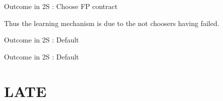 \documentclass[oneside,11pt]{article}
\begin{document}
\begin{table}[H]
\caption{Outcome in 2S : Choose FP contract}
\label{iv_pf}
\begin{center}
\scriptsize{}
\end{center}
 \scriptsize

\end{table}

Thus the learning mechanism is due to the not choosers having failed. 





\begin{table}[H]
\caption{Outcome in 2S : Default}
\label{iv_def}
\begin{center}
\scriptsize{}
\end{center}
 \scriptsize

\end{table}

\begin{table}[H]
\caption{Outcome in 2S : Default}
\label{iv_def_decomp}
\begin{center}
\scriptsize{}
\end{center}
 \scriptsize

\end{table}

\section{LATE}

\begin{table}[H]
\caption{}
\label{tot_tut}
\begin{center}
\scriptsize{}
\end{center}
 \scriptsize
\end{table}
\end{document}
